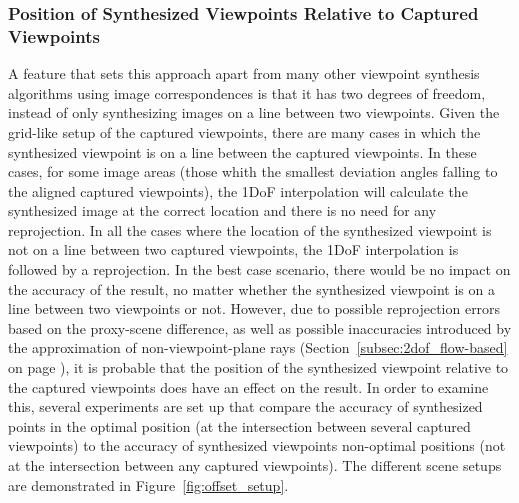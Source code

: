 \begin{comment}
Hypothesis: higher density --> better results, but difference is larger for flow-based.

Hypothesis II: the effect of higher density is more marked near walls and corners

Test:
  - use square room and test 2x2, 6x6, 10x10
  - compare flow with flow, reg with flow, and reg with reg -> 3 graphs
\end{comment}

\subsubsection{Position of Synthesized Viewpoints Relative to Captured Viewpoints}
A feature that sets this approach apart from many other viewpoint synthesis algorithms using image correspondences is that it has two degrees of freedom, instead of only synthesizing images on a line between two viewpoints. Given the grid-like setup of the captured viewpoints, there are many cases in which the synthesized viewpoint is on a line between the captured viewpoints. In these cases, for some image areas (those whith the smallest deviation angles falling to the aligned captured viewpoints), the 1DoF interpolation will calculate the synthesized image at the correct location and there is no need for any reprojection. In all the cases where the location of the synthesized viewpoint is not on a line between two captured viewpoints, the 1DoF interpolation is followed by a reprojection. In the best case scenario, there would be no impact on the accuracy of the result, no matter whether the synthesized viewpoint is on a line between two viewpoints or not. However, due to possible reprojection errors based on the proxy-scene difference, as well as possible inaccuracies introduced by the approximation of non-viewpoint-plane rays (Section~\ref{subsec:2dof_flow-based} on page \pageref{subsec:2dof_flow-based}), it is probable that the position of the synthesized viewpoint relative to the captured viewpoints does have an effect on the result. In order to examine this, several experiments are set up that compare the accuracy of synthesized points in the optimal position (at the intersection between several captured viewpoints) to the accuracy of synthesized viewpoints non-optimal positions (not at the intersection between any captured viewpoints). The different scene setups are demonstrated in Figure~\ref{fig:offset_setup}.

